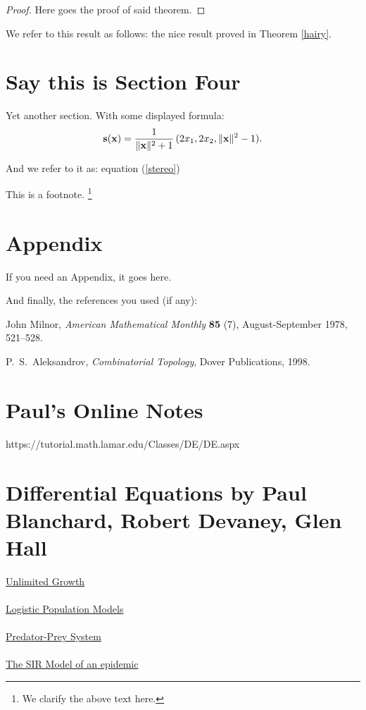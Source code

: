 \documentclass{amsart}
\theoremstyle{definition}
\numberwithin{equation}{section}
\def\ve#1{{\bf #1}}
\def\norm#1{\| {\bf #1} \|}
\begin{document}
\begin{sansmath}
\begin{proof}
  Here goes the proof of said theorem.
\end{proof}

We refer to this result as follows:
the nice result proved in Theorem \ref{hairy}.

\section{Say this is Section Four}

 Yet another section.
With some displayed formula:
    \begin{equation}
    \label{stereo}
       \ve s (\ve x) = {1 \over \norm{x}^2 + 1} \, (2 x_1, 2x_2, \norm{x}^2 - 1) .
    \end{equation}


  And we refer to it as: equation (\ref{stereo})

This is a footnote.
    \footnote{We clarify the above text here.}

    \medskip


\section{Appendix}

If you need an Appendix, it goes here.

\bigskip



And finally, the references you used (if any):


\begin{thebibliography}{12}

John Milnor, {\it
 American Mathematical Monthly}
    {\bf 85} (7), August-September 1978, 521--528.

 \smallskip

    P.~S.~Aleksandrov, {\it Combinatorial Topology},
    Dover Publications, 1998.


\end{thebibliography}

\newpage
\section{Paul's Online Notes}
https://tutorial.math.lamar.edu/Classes/DE/DE.aspx\\
\lipsum[0-2]

\section{Differential Equations by Paul Blanchard, Robert Devaney, Glen Hall}
\underline{Unlimited Growth}\\ %
\lipsum[2-4]\\
\underline{Logistic Population Models}\\ %
\lipsum[4-6]\\
\underline{Predator-Prey System}\\ %
\lipsum[6-8]\\
\underline{The SIR Model of an epidemic}\\ %
\lipsum[8-10]


\end{sansmath}
\end{document}
